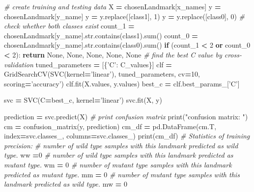 \documentclass[10pt,letterpaper]{article}
\newenvironment{Shaded}{\begin{snugshade}}{\end{snugshade}}
\newcommand{\DecValTok}[1]{\textcolor[rgb]{0.00,0.00,0.81}{{#1}}}
\newcommand{\StringTok}[1]{\textcolor[rgb]{0.31,0.60,0.02}{{#1}}}
\newcommand{\CommentTok}[1]{\textcolor[rgb]{0.56,0.35,0.01}{\textit{{#1}}}}
\newcommand{\VariableTok}[1]{\textcolor[rgb]{0.00,0.00,0.00}{{#1}}}
\newcommand{\ControlFlowTok}[1]{\textcolor[rgb]{0.13,0.29,0.53}{\textbf{{#1}}}}
\newcommand{\OperatorTok}[1]{\textcolor[rgb]{0.81,0.36,0.00}{\textbf{{#1}}}}
\newcommand{\BuiltInTok}[1]{{#1}}
\newcommand{\NormalTok}[1]{{#1}}
\begin{document}
\begin{Shaded}
\begin{Highlighting}[]
    \CommentTok{# create training and testing data}
    \NormalTok{X }\OperatorTok{=} \NormalTok{chosenLandmark[x_names]}
    \NormalTok{y }\OperatorTok{=} \NormalTok{chosenLandmark[y_name]}
    \NormalTok{y }\OperatorTok{=} \NormalTok{y.replace([class1], }\DecValTok{1}\NormalTok{)}
    \NormalTok{y }\OperatorTok{=} \NormalTok{y.replace([class0], }\DecValTok{0}\NormalTok{)}
    \CommentTok{# check whether both classes exist}
    \NormalTok{count_1 }\OperatorTok{=} \NormalTok{chosenLandmark[y_name].}\BuiltInTok{str}\NormalTok{.contains(class1).}\BuiltInTok{sum}\NormalTok{()}
    \NormalTok{count_0 }\OperatorTok{=} \NormalTok{chosenLandmark[y_name].}\BuiltInTok{str}\NormalTok{.contains(class0).}\BuiltInTok{sum}\NormalTok{()}
    \ControlFlowTok{if} \NormalTok{(count_1 }\OperatorTok{<} \DecValTok{2} \OperatorTok{or} \NormalTok{count_0 }\OperatorTok{<} \DecValTok{2}\NormalTok{):}
        \ControlFlowTok{return} \VariableTok{None}\NormalTok{, }\VariableTok{None}\NormalTok{, }\VariableTok{None}\NormalTok{, }\VariableTok{None}\NormalTok{, }\VariableTok{None}
    \CommentTok{# find the best C value by cross-validation}
    \NormalTok{tuned_parameters }\OperatorTok{=} \NormalTok{[\{}\StringTok{'C'}\NormalTok{: C_values\}]}
    \NormalTok{clf }\OperatorTok{=} \NormalTok{GridSearchCV(SVC(kernel}\OperatorTok{=}\StringTok{'linear'}\NormalTok{), tuned_parameters, cv}\OperatorTok{=}\DecValTok{10}\NormalTok{, scoring}\OperatorTok{=}\StringTok{'accuracy'}\NormalTok{)}
    \NormalTok{clf.fit(X.values, y.values)}
    \NormalTok{best_c }\OperatorTok{=} \NormalTok{clf.best_params_[}\StringTok{'C'}\NormalTok{]}
    
    \NormalTok{svc }\OperatorTok{=} \NormalTok{SVC(C}\OperatorTok{=}\NormalTok{best_c, kernel}\OperatorTok{=}\StringTok{'linear'}\NormalTok{)}
    \NormalTok{svc.fit(X, y)}
    
    \NormalTok{prediction }\OperatorTok{=} \NormalTok{svc.predict(X)}
    \CommentTok{# print confusion matrix}
    \BuiltInTok{print}\NormalTok{(}\StringTok{"confusion matrix: "}\NormalTok{)}
    \NormalTok{cm }\OperatorTok{=} \NormalTok{confusion_matrix(y, prediction)}
    \NormalTok{cm_df }\OperatorTok{=} \NormalTok{pd.DataFrame(cm.T, index}\OperatorTok{=}\NormalTok{svc.classes_, columns}\OperatorTok{=}\NormalTok{svc.classes_)}
    \BuiltInTok{print}\NormalTok{(cm_df)}
    \CommentTok{# Statistics of training precision:}
    \CommentTok{# number of wild type samples with this landmark predicted as wild type.}
    \NormalTok{ww }\OperatorTok{=}\DecValTok{0}
    \CommentTok{# number of wild type samples with this landmark predicted as mutant type.}
    \NormalTok{wm }\OperatorTok{=} \DecValTok{0}
    \CommentTok{# number of mutant type samples with this landmark predicted as mutant type.}
    \NormalTok{mm }\OperatorTok{=} \DecValTok{0}
    \CommentTok{# number of mutant type samples with this landmark predicted as wild type.}
    \NormalTok{mw }\OperatorTok{=} \DecValTok{0}
    

\end{Highlighting}
\end{Shaded}
\end{document}
